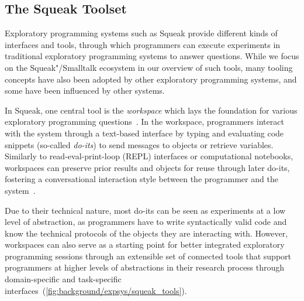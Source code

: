 \subsection*{%
	The Squeak Toolset
	\hfill
}
\label{sec:background/expsys/tools}

Exploratory programming systems such as Squeak provide different kinds of interfaces and tools, through which programmers can execute experiments in traditional exploratory programming systems to answer questions.
While we focus on the Squeak"/Smalltalk ecosystem in our overview of such tools, many tooling concepts have also been adopted by other exploratory programming systems, and some have been influenced by other systems.

In Squeak, one central tool is the \emph{workspace} which lays the foundation for various exploratory programming questions~\cites[chap.~6]{goldberg1984smalltalk}[sec.~1.4]{thiede2023squeak}.
In the workspace, programmers interact with the system through a text-based interface by typing and evaluating code snippets (so-called \emph{do-its}) to send messages to objects or retrieve variables.
Similarly to read-eval-print-loop (REPL) interfaces or computational notebooks, workspaces can preserve prior results and objects for reuse through later do-its, fostering a conversational interaction style between the programmer and the system~\cite{taeumel2022pattern}.

Due to their technical nature, most do-its can be seen as experiments at a low level of abstraction, as programmers have to write syntactically valid code and know the technical protocols of the objects they are interacting with.
However, workspaces can also serve as a starting point for better integrated exploratory programming sessions through an extensible set of connected tools that support programmers at higher levels of abstractions in their research process through domain-specific and task-specific interfaces~(\cref{fig:background/expsys/squeak_tools}).

